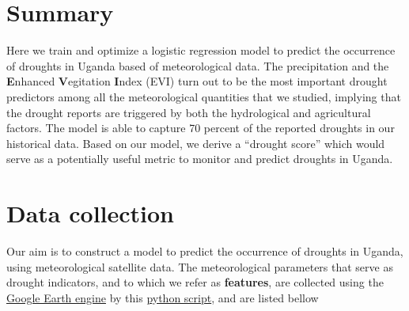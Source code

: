 \documentclass[10pt,parskip=half,
toc=sectionentrywithdots,
bibliography=totocnumbered,
captions=tableheading,numbers=noendperiod]{scrartcl}
\begin{document}
    \begingroup
    \let\cleardoublepage\relax
    \let\clearpage\relax
    \endgroup

\hypertarget{summary}{%
\section{Summary}\label{summary}}

Here we train and optimize a logistic regression model to predict the
occurrence of droughts in Uganda based of meteorological data. The
precipitation and the \textbf{E}nhanced \textbf{V}egitation
\textbf{I}ndex (EVI) turn out to be the most important drought
predictors among all the meteorological quantities that we studied,
implying that the drought reports are triggered by both the hydrological
and agricultural factors. The model is able to capture 70 percent of the
reported droughts in our historical data. Based on our model, we derive
a ``drought score'' which would serve as a potentially useful metric to
monitor and predict droughts in Uganda.

\hypertarget{data-collection}{%
\section{Data collection}\label{data-collection}}

Our aim is to construct a model to predict the occurrence of droughts in
Uganda, using meteorological satellite data. The meteorological
parameters that serve as drought indicators, and to which we refer as
\textbf{features}, are collected using the
\href{https://developers.google.com/earth-engine/python_install}{Google
Earth engine} by this
\href{https://github.com/rodekruis/Drought_IBF/blob/master/GoogleEarthEngine/GEE_get_data.py}{python
script}, and are listed bellow
\end{document}
